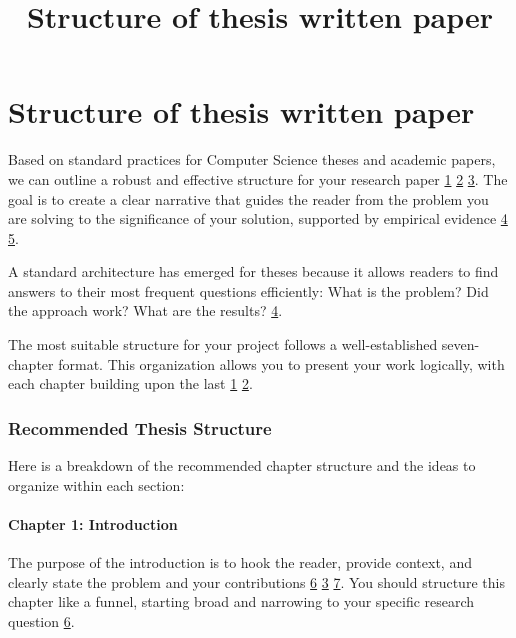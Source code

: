 \documentclass{article}
\title{Structure of thesis written paper}
\begin{document}
\maketitle

\section{Structure of thesis written paper}

Based on standard practices for Computer Science theses and academic papers, we can outline a robust and effective structure for your research paper \hyperref[ref:1]{1} \hyperref[ref:2]{2} \hyperref[ref:3]{3}. The goal is to create a clear narrative that guides the reader from the problem you are solving to the significance of your solution, supported by empirical evidence \hyperref[ref:4]{4} \hyperref[ref:5]{5}.

A standard architecture has emerged for theses because it allows readers to find answers to their most frequent questions efficiently: What is the problem? Did the approach work? What are the results? \hyperref[ref:4]{4}.

The most suitable structure for your project follows a well-established seven-chapter format. This organization allows you to present your work logically, with each chapter building upon the last \hyperref[ref:1]{1} \hyperref[ref:2]{2}.

\subsubsection{Recommended Thesis Structure}

Here is a breakdown of the recommended chapter structure and the ideas to organize within each section:

\paragraph{\textbf{Chapter 1: Introduction}}

The purpose of the introduction is to hook the reader, provide context, and clearly state the problem and your contributions \hyperref[ref:6]{6} \hyperref[ref:3]{3} \hyperref[ref:7]{7}. You should structure this chapter like a funnel, starting broad and narrowing to your specific research question \hyperref[ref:6]{6}.
\end{document}
